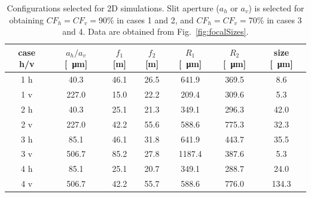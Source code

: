 \documentclass{iucr}              %
\begin{document}
\begin{table}[]
    \label{table:2Dusercases}
    \caption{Configurations selected for 2D simulations. Slit aperture ($a_h$ or $a_v$) is selected for obtaining $CF_h=CF_v=$90\% in cases 1 and 2, and $CF_h=CF_v=$70\% in cases 3 and 4. Data are obtained from Fig.~\ref{fig:focalSizes}.
    }
    \begin{tabular}{c|c|c|c|c|c|c}
         case h/v & $a_h/a_v$ [\SI{}{\micro\meter}] & $f_1$ [m] & $f_2$ [m] & $R_1$ [\SI{}{\micro\meter}]& $R_2$ [\SI{}{\micro\meter}] & size [\SI{}{\micro\meter}]\\
         \hline
1 h &      40.3 & 46.1 &     26.5 &     641.9 &     369.5 &     8.6 
\\
1 v &      227.0 & 15.0 &     22.2 &     209.4 &     309.6 &     5.3 
\\
\hline
2 h &      40.3 & 25.1 &     21.3 &     349.1 &     296.3 &     42.0  
\\
2 v &      227.0 & 42.2 &     55.6 &     588.6 &     775.3 &     32.3 
\\
\hline \hline
3 h &      85.1 & 46.1 &     31.8 &     641.9 &     443.7 &     35.5 
\\
3 v &      506.7 & 85.2 &     27.8 &     1187.4 &     387.6  &     5.3 
\\
\hline
4 h &      85.1 & 25.1 &     20.7 &     349.1 &     288.7 &     24.0 
\\
4 v &      506.7 & 42.2 &     55.7 &     588.6 &     776.0 &     134.3 

    \end{tabular}
\end{table}
\end{document}
